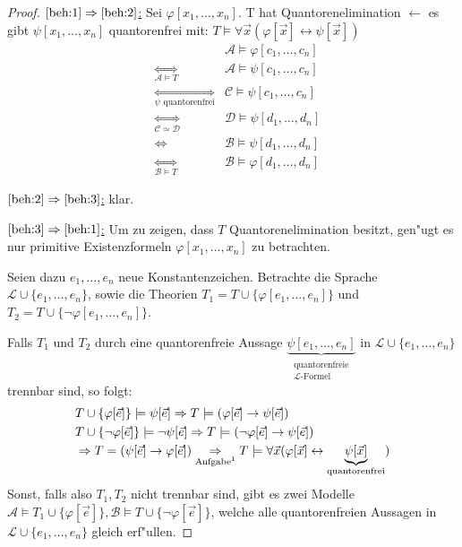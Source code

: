 \documentclass[a4paper,12pt,numbers=noenddot,parskip=full]{scrartcl}
\newcommand{\scrL}{\mathcal{L}}
\newcommand{\scrA}{\mathcal{A}}
\newcommand{\scrB}{\mathcal{B}}
\newcommand{\scrC}{\mathcal{C}}
\newcommand{\scrD}{\mathcal{D}}
\theoremstyle{dotless}
\theoremstyle{remark}
\begin{document}
\begin{proof}
	\underline{$\ref{beh:1}\Rightarrow\ref{beh:2}$:} Sei $\varphi[x_1, \dots, x_n]$. T hat Quantorenelimination $\longleftarrow$ es gibt $\psi[x_1, \dots, x_n]$ quantorenfrei mit: $T \models \forall \vec{x} (\varphi[\vec{x}] \leftrightarrow \psi[\vec{x}])$
	\begin{align*}
		&&\scrA \models \varphi[c_1, \dots, c_n]\\
		&\underset{\scrA \models T}{\Leftrightarrow} &\scrA \models \psi[c_1, \dots, c_n]\\
		&\underset{\psi \text{ quantorenfrei}}{\Leftrightarrow} &\scrC \models \psi[c_1, \dots, c_n]\\
		&\underset{\scrC \simeq \scrD}{\Leftrightarrow} &\scrD \models \psi[d_1, \dots, d_n]\\
		&\Leftrightarrow &\scrB \models \psi[d_1, \dots, d_n]\\
		&\underset{\scrB \models T}{\Leftrightarrow} &\scrB \models \varphi[d_1, \dots, d_n]
	\end{align*}
	
	\underline{$\ref{beh:2} \Rightarrow \ref{beh:3}$:} klar.
	
	\underline{$\ref{beh:3} \Rightarrow \ref{beh:1}$:} Um zu zeigen, dass $T$ Quantorenelimination besitzt, gen"ugt es nur primitive Existenzformeln $\varphi[x_1, \dots, x_n]$ zu betrachten. 
	
	Seien dazu $e_1, \dots, e_n$ neue Konstantenzeichen. Betrachte die Sprache $\scrL \cup \{e_1, \dots, e_n \}$, sowie die Theorien $T_1 = T \cup \{\varphi[e_1, \dots, e_n] \}$ und $T_2 = T \cup \{\lnot \varphi[e_1, \dots, e_n]\}$.
	
	Falls $T_1$ und $T_2$ durch eine quantorenfreie Aussage $\underbrace{\psi[e_1, \dots, e_n]}_{\substack{\text{quantorenfreie}\\ \scrL \text{-Formel}}}$ in $\scrL \cup \{e_1, \dots, e_n \}$ trennbar sind, so folgt:
	\begin{align*}
		&T \cup \{\varphi[\vec{e}] \} \models \psi[\vec{e}] \Rightarrow T \models (\varphi[\vec{e}] \rightarrow \psi[\vec{e}])\\
		&T \cup \{\lnot\varphi[\vec{e}] \} \models \lnot\psi[\vec{e}] \Rightarrow T \models (\lnot\varphi[\vec{e}] \rightarrow \psi[\vec{e}])\\
		&\Rightarrow T = (\psi[\vec{e}] \rightarrow \varphi[\vec{e}]) \underset{\text{Aufgabe\footnotemark}}{\Rightarrow} T \models \forall \vec{x} (\varphi[\vec{x}] \leftrightarrow \underbrace{\psi[\vec{x}]}_{\text{quantorenfrei}})
	\end{align*}
	Sonst, falls also $T_1, T_2$ nicht trennbar sind, gibt es zwei Modelle $\scrA \models T_1 \cup \{\varphi[\vec{e}] \}, \scrB \models T \cup \{\lnot \varphi[\vec{e}] \}$, welche alle quantorenfreien Aussagen in $\scrL \cup \{e_1, \dots, e_n \}$ gleich erf"ullen.
	

\end{proof}
\end{document}
